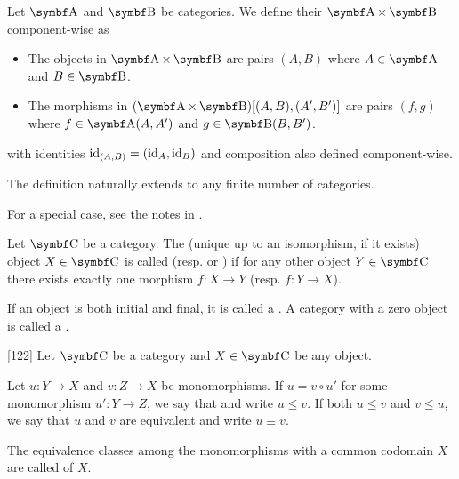 \begin{definition}\label{def:product_category}\cite[exercise 1.1.14]{Leinster2014}
  Let \( \Cat{A} \) and \( \Bold B \) be categories. We define their  \( \Cat{A} \times \Bold B \) component-wise as
  \begin{itemize}
    \item The objects in \( \Cat{A} \times \Bold B \) are pairs \( (A, B) \) where \( A \in \Cat{A} \) and \( B \in \Bold B \).
    \item The morphisms in \( (\Cat{A} \times \Bold B)[(A, B), (A', B')] \) are pairs \( (f, g) \) where \( f \in \Cat{A}(A, A') \) and \( g \in \Bold{B}(B, B') \).
  \end{itemize}
  with identities \( \operatorname{id}_{(A,B)} =(\operatorname{id}_A, \operatorname{id}_B) \) and composition also defined component-wise.

  The definition naturally extends to any finite number of categories.

  For a special case, see the notes in .
\end{definition}

\begin{definition}\label{def:initial_final_objects}\cite[definitions 2.1.7]{Leinster2014}
  Let \( \Cat{C} \) be a category. The (unique up to an isomorphism, if it exists) object \( X \in \Cat{C} \) is called  (resp.  or ) if for any other object \( Y \in \Cat{C} \) there exists exactly one morphism \( f: X \to Y \) (resp. \( f: Y \to X \)).

  If an object is both initial and final, it is called a . A category with a zero object is called a .
\end{definition}

\begin{definition}\label{def:categorical_subobject}\cite{MacLane1994}[122]
  Let \( \Cat{C} \) be a category and \( X \in \Cat{C} \) be any object.

  Let \( u: Y \to X \) and \( v: Z \to X \) be monomorphisms. If \( u = v \circ u' \) for some monomorphism \( u': Y \to Z \), we say that  and write \( u \leq v \). If both \( u \leq v \) and \( v \leq u \), we say that \( u \) and \( v \) are equivalent and write \( u \equiv v \).

  The equivalence classes among the monomorphisms with a common codomain \( X \) are called  of \( X \).
\end{definition}
